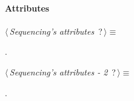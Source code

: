 \paragraph{Attributes}      

	\begin{flushleft} \small
\begin{minipage}{\linewidth}\label{scrap11}\raggedright\small
{} $\langle\,${\itshape {Sequencing's attributes}}\nobreak\ {\footnotesize {?}}$\,\rangle\equiv$
\vspace{-1ex}
\begin{list}{}{} \item

                
        {\NWsep}
\end{list}
\vspace{-1.5ex}
\footnotesize
\begin{list}{}{\setlength{\itemsep}{-\parsep}\setlength{\itemindent}{-\leftmargin}}
\item {\NWtxtMacroNoRef}.

\item{}
\end{list}
\end{minipage}\vspace{4ex}
\end{flushleft}
\begin{flushleft} \small
\begin{minipage}{\linewidth}\label{scrap12}\raggedright\small
{} $\langle\,${\itshape {Sequencing's attributes - 2}}\nobreak\ {\footnotesize {?}}$\,\rangle\equiv$
\vspace{-1ex}
\begin{list}{}{} \item

                
        {\NWsep}
\end{list}
\vspace{-1.5ex}
\footnotesize
\begin{list}{}{\setlength{\itemsep}{-\parsep}\setlength{\itemindent}{-\leftmargin}}
\item {\NWtxtMacroNoRef}.

\item{}
\end{list}
\end{minipage}\vspace{4ex}
\end{flushleft}
